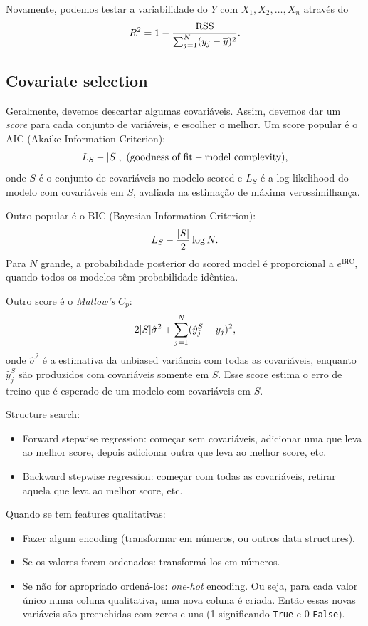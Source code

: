 \documentclass[a4paper,fleqn,12pt]{article}
\begin{document}
Novamente, podemos testar a variabilidade do $Y$ com $X_1, X_2, \ldots, X_n$ através do
$$
R^2 = 1 - \frac{\text{RSS}}{\sum_{j=1}^N (y_j - \overline{y})^2}.
$$

\subsection{Covariate selection}

Geralmente, devemos descartar algumas covariáveis. Assim, devemos dar um \textit{score} para cada conjunto de variáveis, e escolher o melhor. Um score popular é o AIC (Akaike Information Criterion):
$$
L_S - \abs{S}, \text{ (goodness of fit} - \text{model complexity),}
$$
onde $S$ é o conjunto de covariáveis no modelo scored e $L_S$ é a log-likelihood do modelo com covariáveis em $S$, avaliada na estimação de máxima verossimilhança.

Outro popular é o BIC (Bayesian Information Criterion):
$$
L_S - \frac{\abs{S}}{2} \log N.
$$
Para $N$ grande, a probabilidade posterior do scored model é proporcional a $e^{\text{BIC}}$, quando todos os modelos têm probabilidade idêntica.

Outro score é o \textit{Mallow's} $C_p$:
$$
2 \abs{S} \hat{\sigma}^2 + \sum_{j=1}^N (\hat{y}_j^S - y_j)^2,
$$
onde $\hat{\sigma}^2$ é a estimativa da unbiased variância com todas as covariáveis, enquanto $\hat{y}_j^S$ são produzidos com covariáveis somente em $S$. Esse score estima o erro de treino que é esperado de um modelo com covariáveis em $S$.

Structure search:
\begin{itemize}
\item Forward stepwise regression: começar sem covariáveis, adicionar uma que leva ao melhor score, depois adicionar outra que leva ao melhor score, etc.
\item Backward stepwise regression: começar com todas as covariáveis, retirar aquela que leva ao melhor score, etc.
\end{itemize}

Quando se tem features qualitativas:
\begin{itemize}
\item Fazer algum encoding (transformar em números, ou outros data structures).
\item Se os valores forem ordenados: transformá-los em números.
\item Se não for apropriado ordená-los: \textit{one-hot} encoding. Ou seja, para cada valor único numa coluna qualitativa, uma nova coluna é criada. Então essas novas variáveis são preenchidas com zeros e uns (1 significando \texttt{True} e 0 \texttt{False}).
\end{itemize}
\end{document}
